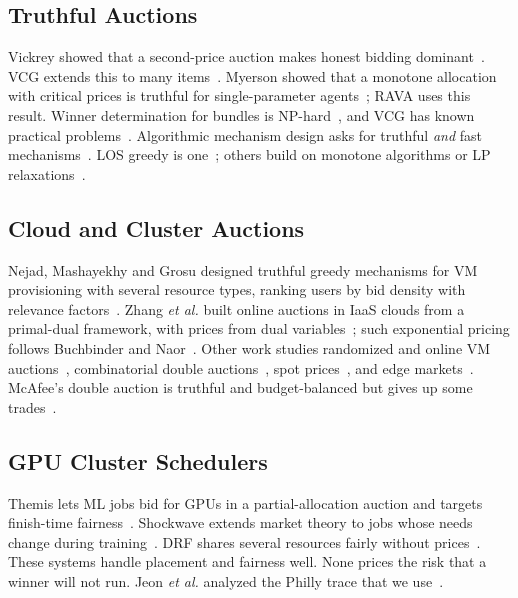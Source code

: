 \documentclass[journal]{IEEEtran}
\theoremstyle{remark}
\begin{document}
\subsection{Truthful Auctions}
Vickrey showed that a second-price auction makes honest bidding dominant~\cite{vickrey1961}. VCG extends this to many items~\cite{clarke1971,groves1973}. Myerson showed that a monotone allocation with critical prices is truthful for single-parameter agents~\cite{myerson1981}; RAVA uses this result. Winner determination for bundles is NP-hard~\cite{sandholm2002,cramton2006}, and VCG has known practical problems~\cite{ausubel2006,rothkopf2007}. Algorithmic mechanism design asks for truthful \emph{and} fast mechanisms~\cite{nisan2001,nisan2007agt}. LOS greedy is one~\cite{lehmann2002}; others build on monotone algorithms or LP relaxations~\cite{archer2001,mualem2008,lavi2011}.

\subsection{Cloud and Cluster Auctions}
Nejad, Mashayekhy and Grosu designed truthful greedy mechanisms for VM provisioning with several resource types, ranking users by bid density with relevance factors~\cite{nejad2015}. Zhang \emph{et al.} built online auctions in IaaS clouds from a primal-dual framework, with prices from dual variables~\cite{zhang2017ton}; such exponential pricing follows Buchbinder and Naor~\cite{buchbinder2009}. Other work studies randomized and online VM auctions~\cite{zhang2014,shi2014}, combinatorial double auctions~\cite{samimi2016}, spot prices~\cite{benyehuda2013}, and edge markets~\cite{luong2017,qiu2021}. McAfee's double auction is truthful and budget-balanced but gives up some trades~\cite{mcafee1992,myerson1983}.

\subsection{GPU Cluster Schedulers}
Themis lets ML jobs bid for GPUs in a partial-allocation auction and targets finish-time fairness~\cite{mahajan2020themis}. Shockwave extends market theory to jobs whose needs change during training~\cite{zheng2023shockwave}. DRF shares several resources fairly without prices~\cite{ghodsi2011}. These systems handle placement and fairness well. None prices the risk that a winner will not run. Jeon \emph{et al.} analyzed the Philly trace that we use~\cite{jeon2019philly}.
\end{document}
